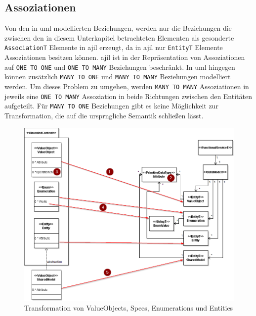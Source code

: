 \documentclass[
	oneside,  %
	ngerman, 
	final, 
	11pt, 
	a4paper, 
	1.1headlines, 
	headinclude=false, 
	footinclude=false, 
	mpinclude=false, 
	pagesize, 
	onecolumn, 
	titlepage, 
	parskip=half, 
	headsepline, 
	chapterprefix=false, 
	version=first, 
	listof=totoc, 
	bibliography=totoc, 
	toc=graduated, 
	fleqn
]{scrbook}
\begin{document}
\subsection{Assoziationen}
Von den in \ac{uml} modellierten Beziehungen, werden nur die Beziehungen die zwischen den in diesem Unterkapitel betrachteten Elementen als gesonderte \texttt{AssociationT} Elemente in \ac{ajil} erzeugt, da in \ac{ajil} nur \texttt{EntityT} Elemente Assoziationen besitzen können. \ac{ajil} ist in der Repräsentation von Assoziationen auf \texttt{ONE TO ONE} und \texttt{ONE TO MANY} Beziehungen beschränkt. In \ac{uml} hingegen können zusätzlich \texttt{MANY TO ONE} und \texttt{MANY TO MANY} Beziehungen modelliert werden. Um dieses Problem zu umgehen, werden \texttt{MANY TO MANY}  Assoziationen in jeweils eine \texttt{ONE TO MANY} Assoziation in beide Richtungen zwischen den Entitäten aufgeteilt. Für \texttt{MANY TO ONE} Beziehungen gibt es keine Möglichkeit zur Transformation, die auf die ursprngliche Semantik schließen lässt. 
\begin{figure}
\includegraphics[width=\textwidth]{Bilder/entities_etc.png}
\caption{Transformation von ValueObjects, Specs, Enumerations und Entities}
\end{figure}
\end{document}
